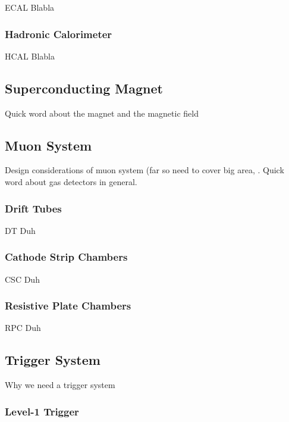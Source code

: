                 ECAL Blabla

            \subsubsection{Hadronic Calorimeter}

                HCAL Blabla

        \subsection{Superconducting Magnet}

            Quick word about the magnet and the magnetic field

        \subsection{Muon System}

            Design considerations of muon system (far so need to cover big area, . Quick word about gas detectors in general.

            \subsubsection{Drift Tubes}

                DT Duh

            \subsubsection{Cathode Strip Chambers}

                CSC Duh

            \subsubsection{Resistive Plate Chambers}

                RPC Duh

        \subsection{Trigger System}

            Why we need a trigger system

            \subsubsection{Level-1 Trigger}

